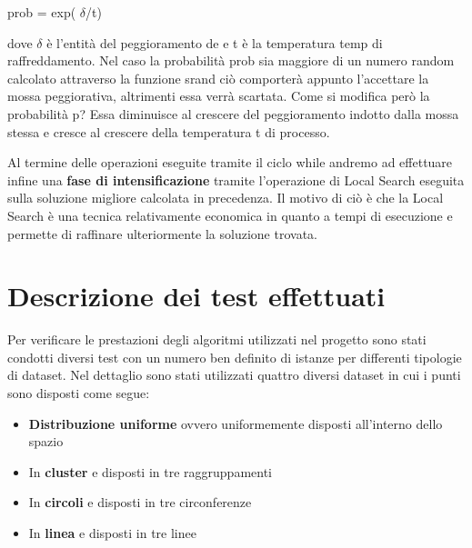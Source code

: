 \documentclass[preprint,12pt]{elsarticle}
\begin{document}
\begin{center}
prob = exp( $\delta$/t)
\end{center}

dove $\delta$ è l'entità del peggioramento de e t è la temperatura temp di raffreddamento. Nel caso la probabilità prob sia maggiore di un numero random calcolato attraverso la funzione srand ciò comporterà appunto l'accettare la mossa peggiorativa, altrimenti essa verrà scartata. Come si modifica però la probabilità p? Essa diminuisce al crescere del peggioramento indotto dalla mossa stessa e cresce al crescere della temperatura t di processo.

Al termine delle operazioni eseguite tramite il ciclo while andremo ad effettuare infine una \textbf{fase di intensificazione} tramite l'operazione di Local Search eseguita sulla soluzione migliore calcolata in precedenza. Il motivo di ciò è che la Local Search è una tecnica relativamente economica in quanto a tempi di esecuzione e permette di raffinare ulteriormente la soluzione trovata.


\section{Descrizione dei test effettuati}
\label{S:3}

Per verificare le prestazioni degli algoritmi utilizzati nel progetto sono stati condotti diversi test con un numero ben definito di istanze per differenti tipologie di dataset. Nel dettaglio sono stati utilizzati quattro diversi dataset in cui i punti sono disposti come segue:

\begin{itemize}
\item \textbf{Distribuzione uniforme} ovvero uniformemente disposti all'interno dello spazio
\item In \textbf{cluster} e disposti in tre raggruppamenti
\item In \textbf{circoli} e disposti in tre circonferenze
\item In \textbf{linea} e disposti in tre linee \\
\end{itemize}
\end{document}
